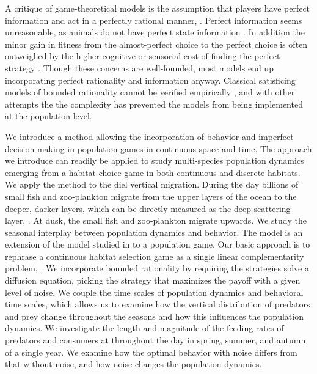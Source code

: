 A critique of game-theoretical models is the assumption that players have perfect information and act in a perfectly rational manner, \citep{jones1999bounded}. Perfect information seems unreasonable, as animals do not have perfect state information \citep{simon1955behavioral}. In addition the minor gain in fitness from the almost-perfect choice to the perfect choice is often outweighed by the higher cognitive or sensorial cost of finding the perfect strategy \citep{simon1956rational, cohen2019bounded}. Though these concerns are well-founded, most models end up incorporating perfect rationality and information anyway. Classical satisficing models of bounded rationality cannot be verified empirically \citep{nonacs1993satisficing}, and with other attempts the \citep{bayesianmodel, thuijsman1995automata} the complexity has prevented the models from being implemented at the population level.




We introduce a method allowing the incorporation of behavior and imperfect decision making in  population games in continuous space and time. The approach we introduce can readily be applied to study multi-species population dynamics emerging from a habitat-choice game in both continuous and discrete habitats. We apply the method to the diel vertical migration. During the day billions of small fish and zoo-plankton migrate from the upper layers of the ocean to the deeper, darker layers, which can be directly measured as the deep scattering layer, \citep{sutton2013vertical, wang2014seasonal}. At dusk, the small fish and zoo-plankton migrate upwards. We study the seasonal interplay between population dynamics and behavior. The model is an extension of the model studied in \citep{verticalmigration} to a population game. Our basic approach is to rephrase a continuous habitat selection game as a single linear complementarity problem, \citep{miller1991copositive}. We incorporate bounded rationality by requiring the strategies solve a diffusion equation, picking the strategy that maximizes the payoff with a given level of noise.
We couple the time scales of population dynamics and behavioral time scales, which allows us to examine how the vertical distribution of predators and prey change throughout the seasons and how this influences the population dynamics. We investigate the length and magnitude of the feeding rates of predators and consumers at throughout the day in spring, summer, and autumn of a single year. We examine how the optimal behavior with noise differs from that without noise, and how noise changes the population dynamics.

